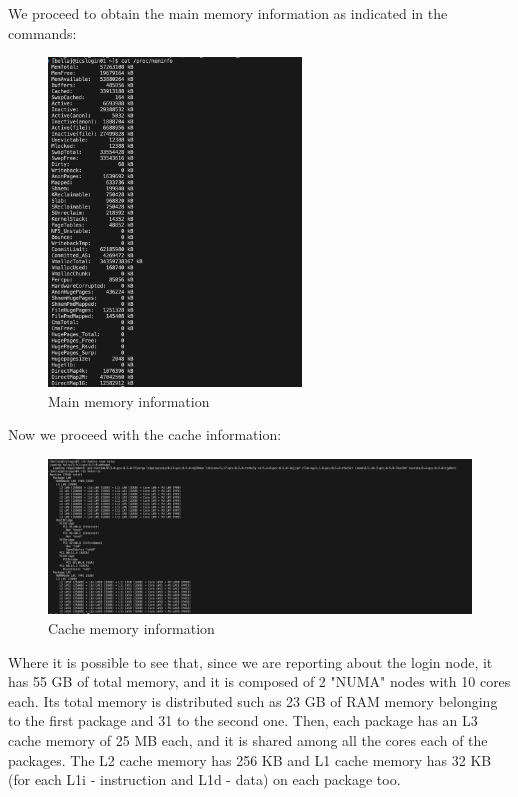 \documentclass[unicode,11pt,a4paper,oneside,numbers=endperiod,openany]{scrartcl}
\begin{document}
We proceed to obtain the main memory information as indicated in the commands: 
\begin{figure}[H]
    \centering
    \includegraphics[width=0.6\textwidth]{./exercise2/2.png}
    \caption{Main memory information}
  \end{figure}

Now we proceed with the cache information:
\begin{figure}[H]
    \centering
    \includegraphics[width=\textwidth]{./exercise2/3.png}
    \caption{Cache memory information}
\end{figure}

Where it is possible to see that, since we are reporting about the login node, it has 55 GB of total memory, and it is composed of 2 "NUMA" nodes with 10 cores each.
Its total memory is distributed such as 23 GB of RAM memory belonging to the first package and 31 to the second one. 
Then, each package has an L3 cache memory of 25 MB each, and it is shared among all the cores each of the packages. 
The L2 cache memory has 256 KB and L1 cache memory has 32 KB (for each L1i - instruction and L1d - data) on each package too. 
\end{document}
